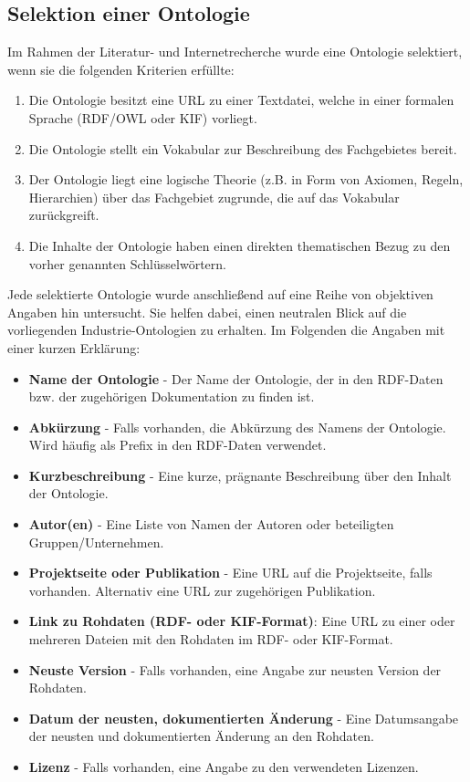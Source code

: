 \documentclass{article}
\begin{document}
\subsection{Selektion einer Ontologie}

Im Rahmen der Literatur- und Internetrecherche wurde eine Ontologie selektiert, wenn sie die folgenden Kriterien erfüllte:

\begin{enumerate}
    \item Die Ontologie besitzt eine URL zu einer Textdatei, welche in einer formalen Sprache (RDF/OWL oder KIF) vorliegt.
    \item Die Ontologie stellt ein Vokabular zur Beschreibung des Fachgebietes bereit.
    \item Der Ontologie liegt eine logische Theorie (z.B. in Form von Axiomen, Regeln, Hierarchien) über das Fachgebiet zugrunde, die auf das Vokabular zurückgreift.
    \item Die Inhalte der Ontologie haben einen direkten thematischen Bezug zu den vorher genannten Schlüsselwörtern.
\end{enumerate}

Jede selektierte Ontologie wurde anschließend auf eine Reihe von objektiven Angaben hin untersucht.
Sie helfen dabei, einen neutralen Blick auf die vorliegenden Industrie-Ontologien zu erhalten.
Im Folgenden die Angaben mit einer kurzen Erklärung:

\begin{itemize}
    \item \textbf{Name der Ontologie} - Der Name der Ontologie, der in den RDF-Daten bzw. der zugehörigen Dokumentation zu finden ist.
    \item \textbf{Abkürzung} - Falls vorhanden, die Abkürzung des Namens der Ontologie. Wird häufig als Prefix in den RDF-Daten verwendet.
    \item \textbf{Kurzbeschreibung} - Eine kurze, prägnante Beschreibung über den Inhalt der Ontologie.
    \item \textbf{Autor(en)} - Eine Liste von Namen der Autoren oder beteiligten Gruppen/Unternehmen.
    \item \textbf{Projektseite oder Publikation} - Eine URL auf die Projektseite, falls vorhanden. Alternativ eine URL zur zugehörigen Publikation.
    \item \textbf{Link zu Rohdaten (RDF- oder KIF-Format)}: Eine URL zu einer oder mehreren Dateien mit den Rohdaten im RDF- oder KIF-Format.
    \item \textbf{Neuste Version} - Falls vorhanden, eine Angabe zur neusten Version der Rohdaten.
    \item \textbf{Datum der neusten, dokumentierten Änderung} - Eine Datumsangabe der neusten und dokumentierten Änderung an den Rohdaten.
    \item \textbf{Lizenz} - Falls vorhanden, eine Angabe zu den verwendeten Lizenzen.
\end{itemize}
\end{document}
